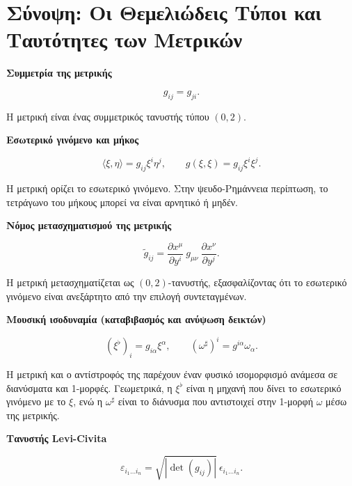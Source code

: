 \documentclass[12pt]{article}
\begin{document}
\section{Σύνοψη: Οι Θεμελιώδεις Τύποι και Ταυτότητες των Μετρικών}

\textbf{Συμμετρία της μετρικής}

\begin{equation}
g_{ij} = g_{ji}. \tag{24}
\end{equation}

Η μετρική είναι ένας συμμετρικός τανυστής τύπου \( (0,2) \).

\textbf{Εσωτερικό γινόμενο και μήκος}

\begin{equation}
\langle \xi, \eta \rangle = g_{ij} \xi^i \eta^j, \qquad g(\xi, \xi) = g_{ij} \xi^i \xi^j. \tag{25, 26}
\end{equation}

Η μετρική ορίζει το εσωτερικό γινόμενο. Στην ψευδο-Ρημάννεια περίπτωση, το τετράγωνο του μήκους μπορεί να είναι αρνητικό ή μηδέν.

\textbf{Νόμος μετασχηματισμού της μετρικής}

\begin{equation}
\tilde{g}_{ij} = \frac{\partial x^\mu}{\partial y^i} \ g_{\mu\nu} \ \frac{\partial x^\nu}{\partial y^j}. \tag{27}
\end{equation}

Η μετρική μετασχηματίζεται ως \( (0,2) \)-τανυστής, εξασφαλίζοντας ότι το εσωτερικό γινόμενο είναι ανεξάρτητο από την επιλογή συντεταγμένων.

\textbf{Μουσική ισοδυναμία (καταβιβασμός και ανύψωση δεικτών)}

\begin{equation}
(\xi^\flat)_i = g_{i\alpha} \xi^\alpha, \qquad (\omega^\sharp)^i = g^{i\alpha} \omega_\alpha. \tag{28, 29}
\end{equation}

Η μετρική και ο αντίστροφός της παρέχουν έναν φυσικό ισομορφισμό ανάμεσα σε διανύσματα και 1-μορφές. Γεωμετρικά, η \( \xi^\flat \) είναι η μηχανή που δίνει το εσωτερικό γινόμενο με το \( \xi \), ενώ η \( \omega^\sharp \) είναι το διάνυσμα που αντιστοιχεί στην 1-μορφή \( \omega \) μέσω της μετρικής.

\textbf{Τανυστής Levi-Civita}

\begin{equation}
\varepsilon_{i_1 \dots i_n} = \sqrt{|\det(g_{ij})|} \ \epsilon_{i_1 \dots i_n}. \tag{30}
\end{equation}
\end{document}
